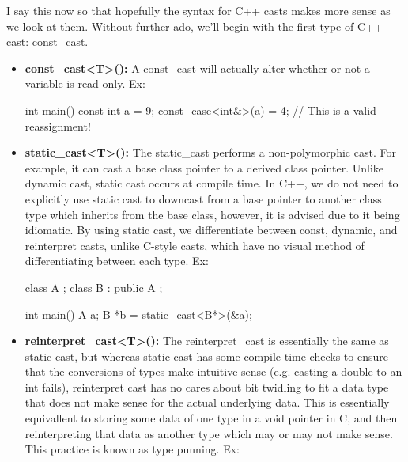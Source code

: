 \documentclass{article}
\begin{document}
I say this now so that hopefully the syntax for C++ casts makes more sense as we look at them. Without
further ado, we’ll begin with the first type of C++ cast: const\_cast.

\begin{itemize}

\item{%
    \textbf{const\_cast<T>():} A const\_cast will actually alter whether or not a variable is read-only. Ex:

    \begin{cpplst}

    int main()
    {
        const int a = 9;
        const_case<int&>(a) = 4; // This is a valid reassignment!
    }

    \end{cpplst}
}

\item{%
    \textbf{static\_cast<T>():} The static\_cast performs a non-polymorphic cast. For example, it can
    cast a base class pointer to a derived class pointer. Unlike dynamic cast, static cast occurs at compile
    time. In C++, we do not need to explicitly use static cast to downcast from a base pointer to another
    class type which inherits from the base class, however, it is advised due to it being idiomatic. By using
    static cast, we differentiate between const, dynamic, and reinterpret casts, unlike C-style casts, which
    have no visual method of differentiating between each type. Ex:

    \begin{cpplst}

    class A {};
    class B : public A {};

    int main()
    {
        A a;
        B *b = static_cast<B*>(&a);
    }

    \end{cpplst}
}

\item{%
    \textbf{reinterpret\_cast<T>():} The reinterpret\_cast is essentially the same as static cast, but
    whereas static cast has some compile time checks to ensure that the conversions of types make
    intuitive sense (e.g. casting a double to an int fails), reinterpret cast has no cares about bit twidling
    to fit a data type that does not make sense for the actual underlying data. This is essentially
    equivallent to storing some data of one type in a void pointer in C, and then reinterpreting that data as
    another type which may or may not make sense. This practice is known as type punning. Ex:

}
\end{itemize}
\end{document}
